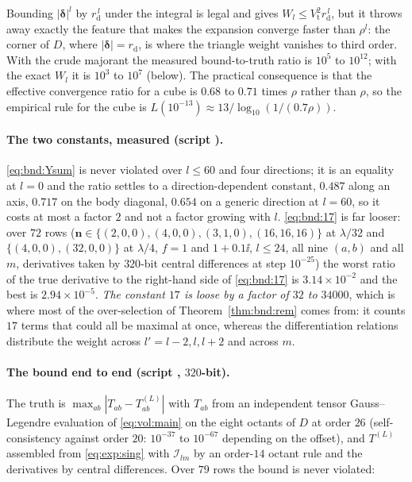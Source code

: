 \begin{remark}
\label{rem:bnd:W}
Bounding $|\boldsymbol{\delta}|^l$ by $r_{\mathrm{d}}^{\,l}$ under the integral is legal
and gives $W_l \le V_{\mathrm{t}}^{2}r_{\mathrm{d}}^{\,l}$, but it throws away exactly the
feature that makes the expansion converge faster than $\rho^l$: the corner of $D$, where
$|\boldsymbol{\delta}| = r_{\mathrm{d}}$, is where the triangle weight vanishes to third
order. With the crude majorant the measured bound-to-truth ratio is $10^{5}$ to
$10^{12}$; with the exact $W_l$ it is $10^{3}$ to $10^{7}$ (below). The practical
consequence is that the effective convergence ratio for a cube is $0.68$ to $0.71$ times
$\rho$ rather than $\rho$, so the empirical rule for the cube is
$L(10^{-13}) \approx 13/\log_{10}(1/(0.7\rho))$.
\end{remark}

\paragraph{The two constants, measured (script ).} \eqref{eq:bnd:Ysum} is
never violated over $l \le 60$ and four directions; it is an equality at $l = 0$ and the
ratio settles to a direction-dependent constant, $0.487$ along an axis, $0.717$ on the
body diagonal, $0.654$ on a generic direction at $l = 60$, so it costs at most a factor
$2$ and not a factor growing with $l$. \eqref{eq:bnd:17} is far looser: over $72$ rows
($\mathbf{n} \in \{(2,0,0),(4,0,0),(3,1,0),(16,16,16)\}$ at $\lambda/32$ and
$\{(4,0,0),(32,0,0)\}$ at $\lambda/4$, $f = 1$ and $1+0.1\ii$, $l \le 24$, all nine
$(a,b)$ and all $m$, derivatives taken by $320$-bit central differences at step
$10^{-25}$) the worst ratio of the true derivative to the right-hand side of
\eqref{eq:bnd:17} is $3.14\times10^{-2}$ and the best is $2.94\times10^{-5}$. \emph{The
constant $17$ is loose by a factor of $32$ to $34000$}, which is where most of the
over-selection of Theorem~\ref{thm:bnd:rem} comes from: it counts $17$ terms that could
all be maximal at once, whereas the differentiation relations distribute the weight
across $l' = l-2, l, l+2$ and across $m$.

\paragraph{The bound end to end (script , $320$-bit).} The truth is
$\max_{ab}|T_{ab} - T^{(L)}_{ab}|$ with $T_{ab}$ from an independent 
tensor Gauss--Legendre evaluation of \eqref{eq:vol:main} on the eight octants of $D$ at
order $26$ (self-consistency against order $20$: $10^{-37}$ to $10^{-67}$ depending on
the offset), and $T^{(L)}$ assembled from \eqref{eq:exp:sing} with $\mathcal{I}_{lm}$ by
an order-$14$ octant rule and the derivatives by central differences. Over $79$ rows the
bound is never violated:


